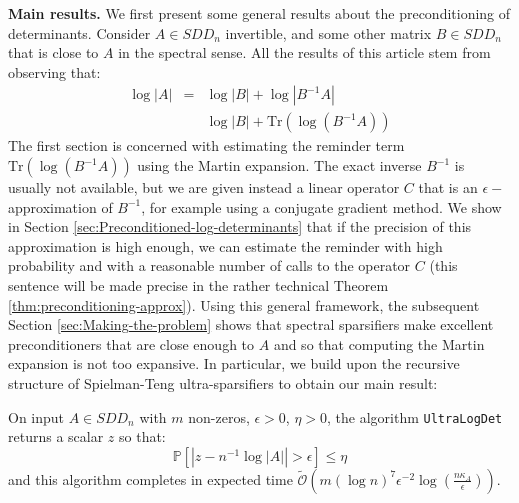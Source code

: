 \textbf{Main results.} We first present some general results about
the preconditioning of determinants. Consider $A\in SDD_{n}$ invertible,
and some other matrix $B\in SDD_{n}$ that is close to $A$ in the
spectral sense. All the results of this article stem from observing
that:
\begin{eqnarray*}
\log\left|A\right| & = & \log\left|B\right|+\log\left|B^{-1}A\right|\\
 &  & \log\left|B\right|+\text{Tr}\left(\log\left(B^{-1}A\right)\right)
\end{eqnarray*}
The first section is concerned with estimating the reminder term $\text{Tr}\left(\log\left(B^{-1}A\right)\right)$
using the Martin expansion. The exact inverse $B^{-1}$ is usually
not available, but we are given instead a linear operator $C$ that
is an $\epsilon-$approximation of $B^{-1}$, for example using a
conjugate gradient method. We show in Section \ref{sec:Preconditioned-log-determinants}
that if the precision of this approximation is high enough, we can
estimate the reminder with high probability and with a reasonable
number of calls to the operator $C$ (this sentence will be made precise
in the rather technical Theorem \ref{thm:preconditioning-approx}).
Using this general framework, the subsequent Section \ref{sec:Making-the-problem}
shows that spectral sparsifiers make excellent preconditioners that
are close enough to $A$ and so that computing the Martin expansion
is not too expansive. In particular, we build upon the recursive structure
of Spielman-Teng ultra-sparsifiers to obtain our main result:

\begin{theorem}\label{thm:ultra_main}On input $A\in SDD_{n}$ with
$m$ non-zeros, $\epsilon>0$, $\eta>0$, the algorithm \texttt{UltraLogDet}
returns a scalar $z$ so that:
\[
\mathbb{P}\left[\left|z-n^{-1}\log\left|A\right|\right|>\epsilon\right]\leq\eta
\]
and this algorithm completes in expected time $\tilde{\mathcal{O}}\left(m\left(\log n\right)^{7}\epsilon^{-2}\log\left(\frac{n\kappa_{A}}{\epsilon}\right)\right)$.

\end{theorem}

